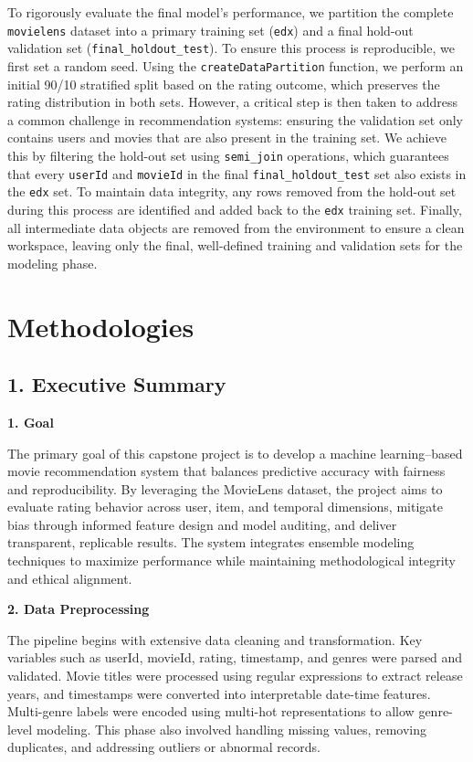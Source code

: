 \documentclass[
]{article}
\begin{document}
To rigorously evaluate the final model's performance, we partition the
complete \texttt{movielens} dataset into a primary training set
(\texttt{edx}) and a final hold-out validation set
(\texttt{final\_holdout\_test}). To ensure this process is reproducible,
we first set a random seed. Using the \texttt{createDataPartition}
function, we perform an initial 90/10 stratified split based on the
rating outcome, which preserves the rating distribution in both sets.
However, a critical step is then taken to address a common challenge in
recommendation systems: ensuring the validation set only contains users
and movies that are also present in the training set. We achieve this by
filtering the hold-out set using \texttt{semi\_join} operations, which
guarantees that every \texttt{userId} and \texttt{movieId} in the final
\texttt{final\_holdout\_test} set also exists in the \texttt{edx} set.
To maintain data integrity, any rows removed from the hold-out set
during this process are identified and added back to the \texttt{edx}
training set. Finally, all intermediate data objects are removed from
the environment to ensure a clean workspace, leaving only the final,
well-defined training and validation sets for the modeling phase.
\newpage

\section{Methodologies}\label{methodologies}

\subsection{1. Executive Summary}\label{executive-summary}

\textbf{1. Goal}

The primary goal of this capstone project is to develop a machine
learning--based movie recommendation system that balances predictive
accuracy with fairness and reproducibility. By leveraging the MovieLens
dataset, the project aims to evaluate rating behavior across user, item,
and temporal dimensions, mitigate bias through informed feature design
and model auditing, and deliver transparent, replicable results. The
system integrates ensemble modeling techniques to maximize performance
while maintaining methodological integrity and ethical alignment.

\textbf{2. Data Preprocessing}

The pipeline begins with extensive data cleaning and transformation. Key
variables such as userId, movieId, rating, timestamp, and genres were
parsed and validated. Movie titles were processed using regular
expressions to extract release years, and timestamps were converted into
interpretable date-time features. Multi-genre labels were encoded using
multi-hot representations to allow genre-level modeling. This phase also
involved handling missing values, removing duplicates, and addressing
outliers or abnormal records.
\end{document}
